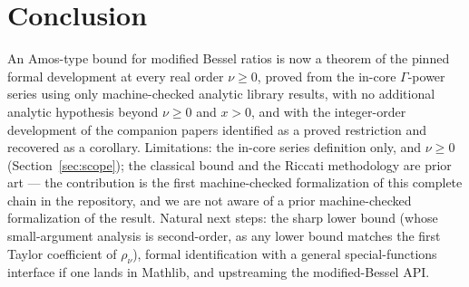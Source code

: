 \documentclass[11pt]{article}
\begin{document}
\section{Conclusion}

An Amos-type bound for modified Bessel ratios is now a theorem of
the pinned formal development at every real order $\nu \ge 0$,
proved from the in-core $\Gamma$-power series using only
machine-checked analytic library results, with no additional
analytic hypothesis beyond $\nu \ge 0$ and $x > 0$, and with
the integer-order development of the companion papers identified as
a proved restriction and recovered as a corollary.  Limitations:
the in-core series definition only, and $\nu \ge 0$
(Section~\ref{sec:scope}); the classical bound and the Riccati
methodology are prior art --- the contribution is the first
machine-checked formalization of this complete chain in the
repository, and we are not aware of a prior machine-checked
formalization of the result.  Natural next steps: the sharp lower
bound (whose small-argument analysis is second-order, as any lower
bound matches the first Taylor coefficient of $\rho_\nu$), formal
identification with a general special-functions interface if one
lands in Mathlib, and upstreaming the modified-Bessel API.
\end{document}
